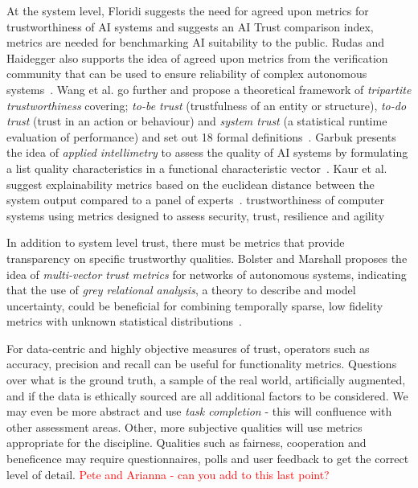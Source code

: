 At the system level, Floridi suggests the need for agreed upon metrics for trustworthiness of AI systems and suggests an  AI Trust comparison index, metrics are needed for benchmarking AI suitability to the public. 
%
Rudas and Haidegger also supports the idea of agreed upon metrics from the verification community that can be used to ensure reliability of complex autonomous systems~\cite{Rudas2020}. Wang et al. go further and propose a  theoretical framework of \emph{tripartite trustworthiness} covering; \emph{to-be trust} (trustfulness of an entity or structure), \emph{to-do trust} (trust in an action or behaviour) and \emph{system trust} (a statistical runtime evaluation of performance) and set out 18 formal definitions~\cite{Wang2020}. 
%
Garbuk presents the idea of \emph{applied intellimetry} to assess the quality of AI systems by formulating a list quality characteristics in a functional characteristic vector~\cite{garbuk2018intellimetry}. 
%
Kaur et al. suggest explainability metrics based on the euclidean distance between the system output compared to a panel of experts~\cite{kaur2021trustworthy}. 
%
trustworthiness of computer systems using metrics designed to assess security, trust, resilience and agility~\cite{cho2019stram}


In addition to system level trust, there must be metrics that provide transparency on specific trustworthy qualities. 
%
Bolster and Marshall proposes the idea of \emph{multi-vector trust metrics} for networks of autonomous systems, indicating that the use of \emph{grey relational analysis}, a theory to describe and model uncertainty, could be beneficial for combining temporally sparse, low fidelity metrics with unknown statistical distributions~\cite{Bolster2014}. 

For data-centric and highly objective measures of trust, operators such as accuracy, precision and recall can be useful for functionality metrics. Questions over what is the ground truth, a sample of the real world, artificially augmented, and if the data is ethically sourced are all additional factors to be considered. We may even be more abstract and use \emph{task completion} - this will confluence with other assessment areas. 
%
Other, more subjective qualities will use metrics appropriate for the discipline. Qualities such as fairness, cooperation and beneficence may require questionnaires, polls and user feedback to get the correct level of detail. 
%
\textcolor{red}{Pete and Arianna - can you add to this last point?}



